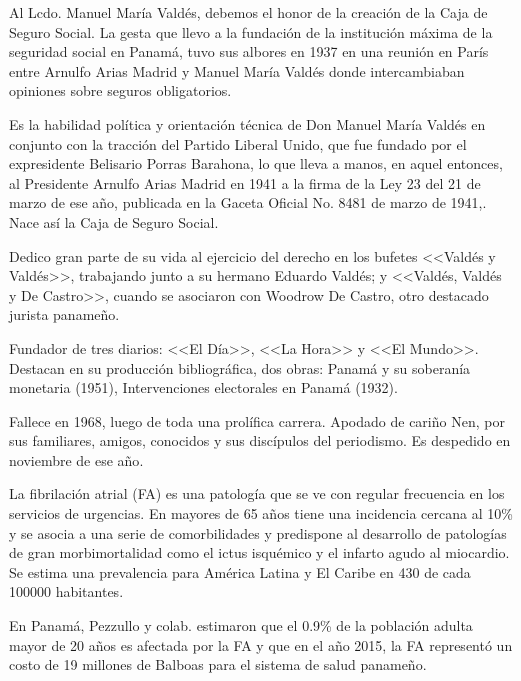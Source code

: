 \documentclass[a4paper]{article}
\let\cite=\supercite
\begin{document}
\begin{multicols}{3}
Al Lcdo. Manuel María Valdés, debemos el honor de la creación de la Caja de
Seguro Social. La gesta que llevo a la fundación de la institución máxima de
la seguridad social en Panamá, tuvo sus albores en 1937 en una reunión en
París entre Arnulfo Arias Madrid y Manuel María Valdés donde intercambiaban
opiniones sobre seguros obligatorios\cite{Pinock95}.

Es la habilidad política y orientación técnica de Don Manuel María Valdés en
conjunto con la tracción del Partido Liberal Unido, que fue fundado por el
expresidente Belisario Porras Barahona, lo que lleva a manos, en aquel entonces,
al Presidente Arnulfo Arias Madrid en 1941 a la firma de la Ley 23 del 21 de
marzo de ese año, publicada en la Gaceta Oficial No. 8481 de marzo de
1941\cite{Pinock95},\cite{gaceta1941}. Nace así la Caja de Seguro Social.

Dedico gran parte de su vida al ejercicio del derecho en los bufetes <<Valdés y
Valdés>>, trabajando junto a su hermano Eduardo Valdés; y <<Valdés, Valdés y
De Castro>>, cuando se asociaron con Woodrow De Castro, otro destacado jurista
panameño.

Fundador de tres diarios: <<El Día>>, <<La Hora>> y <<El Mundo>>. Destacan en
su producción bibliográfica, dos obras: Panamá y su soberanía monetaria (1951),
Intervenciones electorales en Panamá (1932)\cite{Leonard15}.

Fallece en 1968, luego de toda una prolífica carrera. Apodado de cariño Nen,
por sus familiares, amigos, conocidos y sus discípulos del periodismo. Es
despedido en noviembre de ese año\cite{Lot68}.

\closearticle



La fibrilación atrial (FA) es una patología que se ve con regular frecuencia
en los servicios de urgencias. En mayores de 65 años tiene una incidencia
cercana al 10\% y se asocia a una serie de comorbilidades y predispone al
desarrollo de patologías de gran morbimortalidad como el ictus isquémico y el
infarto agudo al miocardio. Se estima una prevalencia para América Latina y El
Caribe en 430 de cada 100000 habitantes\cite{brundel_atrial_2022}.

En Panamá, Pezzullo y colab. estimaron que el 0.9\% de la población adulta
mayor de 20 años es afectada por la FA y que en el año 2015, la FA representó
un costo de 19 millones de Balboas para el sistema de salud
panameño\cite{pezzullo2016}.


\end{multicols}
\end{document}
